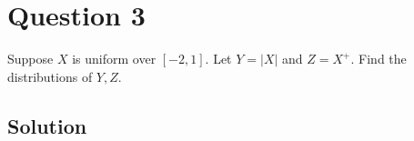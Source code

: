 \section*{Question 3}

Suppose \( X \) is uniform over \( [-2,1] \).
Let \( Y=|X| \) and \( Z=X^{+} \).
Find the distributions of \( Y, Z \).

\subsection*{Solution}
